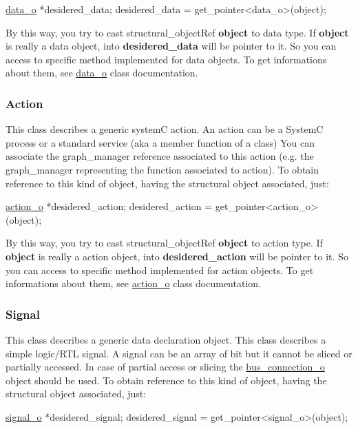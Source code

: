 \begin{DoxyCode}
\hyperlink{classdata__o}{data\_o} *desidered\_data;
desidered\_data = get\_pointer<data\_o>(object);
\end{DoxyCode}
 By this way, you try to cast structural\+\_\+object\+Ref {\bfseries object} to data type. If {\bfseries object} is really a data object, into {\bfseries desidered\+\_\+data} will be pointer to it. So you can access to specific method implemented for data objects. To get informations about them, see \hyperlink{classdata__o}{data\+\_\+o} class documentation.\hypertarget{src_circuit_page_s_o_action}{}\subsubsection{Action}\label{src_circuit_page_s_o_action}
This class describes a generic systemC action. An action can be a SystemC process or a standard service (aka a member function of a class) You can associate the graph\+\_\+manager reference associated to this action (e.\+g. the graph\+\_\+manager representing the function associated to action). To obtain reference to this kind of object, having the structural object associated, just\+: 
\begin{DoxyCode}
\hyperlink{classaction__o}{action\_o} *desidered\_action;
desidered\_action = get\_pointer<action\_o>(object);
\end{DoxyCode}
 By this way, you try to cast structural\+\_\+object\+Ref {\bfseries object} to action type. If {\bfseries object} is really a action object, into {\bfseries desidered\+\_\+action} will be pointer to it. So you can access to specific method implemented for action objects. To get informations about them, see \hyperlink{classaction__o}{action\+\_\+o} class documentation.\hypertarget{src_circuit_page_s_o_signal}{}\subsubsection{Signal}\label{src_circuit_page_s_o_signal}
This class describes a generic data declaration object. This class describes a simple logic/\+R\+TL signal. A signal can be an array of bit but it cannot be sliced or partially accessed. In case of partial access or slicing the \hyperlink{classbus__connection__o}{bus\+\_\+connection\+\_\+o} object should be used. To obtain reference to this kind of object, having the structural object associated, just\+: 
\begin{DoxyCode}
\hyperlink{classsignal__o}{signal\_o} *desidered\_signal;
desidered\_signal = get\_pointer<signal\_o>(object);
\end{DoxyCode}
